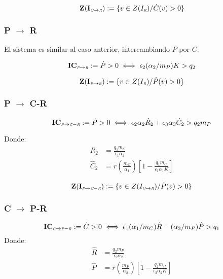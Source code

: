 \begin{equation}
\mathbf{Z(I_{\textit{\tiny C} \to \textit{\tiny R}})} := \{v \in Z(I_{\textit{\tiny R}}) / \dot{C}(v) > 0\}
\end{equation}


\subsubsection{P $\to$ R}
El sistema es similar al caso anterior, intercambiando $P$ por $C$.

\begin{equation} \mathbf{IC_{\textit{\tiny P} \to \textit{\tiny R}}} := \dot{P}>0 \iff \epsilon_2(\alpha_2/m_P) K > q_2 \end{equation}

\begin{equation}
\mathbf{Z(I_{\textit{\tiny P} \to \textit{\tiny R}})} := \{v \in Z(I_{\textit{\tiny R}}) / \dot{P}(v) > 0\}
\end{equation}

            
\subsubsection{P $\to$ C-R}

\begin{equation} \mathbf{IC_{\textit{\tiny P} \to \textit{\tiny C}-\textit{\tiny R}}} := \dot{P} >0 \iff \epsilon_2\alpha_2\hat{R}_2 + \epsilon_3\alpha_3\hat{C}_2 > q_2 m_P \end{equation}

Donde:
\begin{equation}
\begin{aligned}
\hat{R}_2 &= \frac{q_1 m_C}{\epsilon_1 \alpha_1} \\
\hat{C}_2 &=  r(\frac{m_C}{\alpha_1}) \left[ 1 - \frac{q_1 m_C}{\epsilon_1 \alpha_1 K} \right] 
\end{aligned}
\end{equation}

\begin{equation}
\mathbf{Z(I_{\textit{\tiny P} \to \textit{\tiny C}-\textit{\tiny R}})} := \{v \in Z(I_{\textit{\tiny C} \to \textit{\tiny R}}) / \dot{P}(v) > 0\}
\end{equation}


\subsubsection{C $\to$ P-R}

\begin{equation} \mathbf{IC_{\textit{\tiny C} \to \textit{\tiny P}-\textit{\tiny R}}} := \dot{C}>0 \iff \epsilon_1(\alpha_1/m_C)\hat{R} - (\alpha_3/m_P)\hat{P}> q_1 \end{equation}
Donde:
\begin{equation}
\begin{aligned}
\hat{R} & = \frac{q_2 m_P}{\epsilon_2 \alpha_2} \\
\hat{P} & = r(\frac{m_P}{\alpha_2}) \left[ 1- \frac{q_2 m_P}{\epsilon_2 \alpha_2 K} \right]
\end{aligned}
\end{equation}

